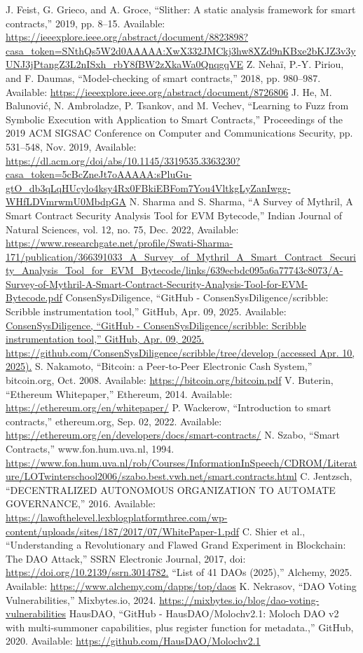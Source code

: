 \documentclass[conference]{IEEEtran}
\begin{document}
\begin{thebibliography}{00}
 J. Feist, G. Grieco, and A. Groce, “Slither: A static analysis framework for smart contracts,” 2019, pp. 8–15. Available: \url{https://ieeexplore.ieee.org/abstract/document/8823898?casa_token=SNthQs5W2d0AAAAA:XwX332JMCkj3hw8XZd9nKBxe2bKJZ3v3yUNJ3jPtangZ3L2nISxh_rbY8fBW2zXkaWa0QnqgqVE}
 Z. Nehaï, P.-Y. Piriou, and F. Daumas, “Model-checking of smart contracts,” 2018, pp. 980–987. Available: \url{https://ieeexplore.ieee.org/abstract/document/8726806}
 J. He, M. Balunović, N. Ambroladze, P. Tsankov, and M. Vechev, “Learning to Fuzz from Symbolic Execution with Application to Smart Contracts,” Proceedings of the 2019 ACM SIGSAC Conference on Computer and Communications Security, pp. 531–548, Nov. 2019, Available: \url{https://dl.acm.org/doi/abs/10.1145/3319535.3363230?casa_token=5cBcZneJt7oAAAAA:sPluGu-gtO_db3qLqHUcylo4ksy4Rx0FBkiEBFom7You4VltkgLyZanIwgg-WHfLDVmrwmU0MbdpGA}
 N. Sharma and S. Sharma, “A Survey of Mythril, A Smart Contract Security Analysis Tool for EVM Bytecode,” Indian Journal of Natural Sciences, vol. 12, no. 75, Dec. 2022, Available:
\url{https://www.researchgate.net/profile/Swati-Sharma-171/publication/366391033_A_Survey_of_Mythril_A_Smart_Contract_Security_Analysis_Tool_for_EVM_Bytecode/links/639ecbdc095a6a77743c8073/A-Survey-of-Mythril-A-Smart-Contract-Security-Analysis-Tool-for-EVM-Bytecode.pdf}
 ConsenSysDiligence, “GitHub - ConsenSysDiligence/scribble: Scribble instrumentation tool,” GitHub, Apr. 09, 2025. Available:  
\url{ConsenSysDiligence, “GitHub - ConsenSysDiligence/scribble: Scribble instrumentation tool,” GitHub, Apr. 09, 2025. https://github.com/ConsenSysDiligence/scribble/tree/develop (accessed Apr. 10, 2025).}
 S. Nakamoto, “Bitcoin: a Peer-to-Peer Electronic Cash System,” bitcoin.org, Oct. 2008. Available: 
\url{https://bitcoin.org/bitcoin.pdf}
 V. Buterin, “Ethereum Whitepaper,” Ethereum, 2014. Available: 
\url{https://ethereum.org/en/whitepaper/}
 P. Wackerow, “Introduction to smart contracts,” ethereum.org, Sep. 02, 2022. Available: 
\url{https://ethereum.org/en/developers/docs/smart-contracts/}
 N. Szabo, “Smart Contracts,” www.fon.hum.uva.nl, 1994. 
\url{https://www.fon.hum.uva.nl/rob/Courses/InformationInSpeech/CDROM/Literature/LOTwinterschool2006/szabo.best.vwh.net/smart.contracts.html}
 C. Jentzsch, “DECENTRALIZED AUTONOMOUS ORGANIZATION TO AUTOMATE GOVERNANCE,” 2016. Available: 
\url{https://lawofthelevel.lexblogplatformthree.com/wp-content/uploads/sites/187/2017/07/WhitePaper-1.pdf}
 C. Shier et al., “Understanding a Revolutionary and Flawed Grand Experiment in Blockchain: The DAO Attack,” SSRN Electronic Journal, 2017, doi: 
\url{https://doi.org/10.2139/ssrn.3014782.}
 “List of 41 DAOs (2025),” Alchemy, 2025. Available:
\url{https://www.alchemy.com/dapps/top/daos}
 K. Nekrasov, “DAO Voting Vulnerabilities,” Mixbytes.io, 2024.
\url{https://mixbytes.io/blog/dao-voting-vulnerabilities}
 HausDAO, “GitHub - HausDAO/Molochv2.1: Moloch DAO v2 with multi-summoner capabilities, plus register function for metadata.,” GitHub, 2020. Available:
\url{https://github.com/HausDAO/Molochv2.1}
\end{thebibliography}
\end{document}
